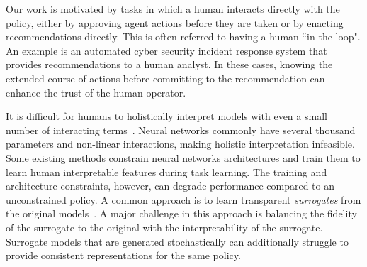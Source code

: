 \documentclass[letterpaper]{article} %
\begin{document}
Our work is motivated by tasks in which a human interacts directly with the policy, either by approving agent actions before they are taken or by enacting recommendations directly.
This is often referred to having a human ``in the loop".
An example is an automated cyber security incident response system that provides recommendations to a human analyst.
In these cases, knowing the extended course of actions before committing to the recommendation can enhance the trust of the human operator.

It is difficult for humans to holistically interpret models with even a small number of interacting terms~\cite{lipton2018}.
Neural networks commonly have several thousand parameters and non-linear interactions, making holistic interpretation infeasible.
Some existing methods constrain neural networks architectures and train them to learn human interpretable features during task learning. %
The training and architecture constraints, however, can degrade performance compared to an unconstrained policy.
A common approach is to learn transparent \emph{surrogates} from the original models~\cite{adadi2018}.
A major challenge in this approach is balancing the fidelity of the surrogate to the original with the interpretability of the surrogate.
Surrogate models that are generated stochastically can additionally struggle to provide consistent representations for the same policy.
\end{document}
